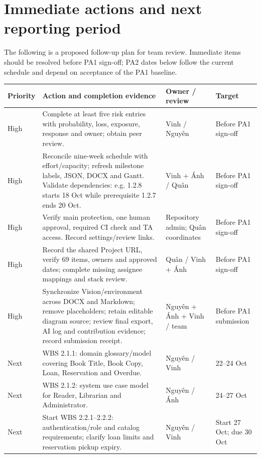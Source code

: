 \documentclass[11pt,a4paper]{article}
\begin{document}
\newpage
\section{Immediate actions and next reporting period}
The following is a proposed follow-up plan for team review. Immediate items should be resolved before PA1 sign-off; PA2 dates below follow the current schedule and depend on acceptance of the PA1 baseline.

{\small
\begin{tabularx}{\textwidth}{@{}P{17mm}YP{29mm}P{23mm}@{}}
\toprule
{}\textbf{Priority} & \textbf{Action and completion evidence} & \textbf{Owner / review} & \textbf{Target} \\
\midrule
High & Complete at least five risk entries with probability, loss, exposure, response and owner; obtain peer review. & Vinh / Nguyên & Before PA1 sign-off \\
\addlinespace[2pt]
High & Reconcile nine-week schedule with effort/capacity; refresh milestone labels, JSON, DOCX and Gantt. Validate dependencies: e.g. 1.2.8 starts 18 Oct while prerequisite 1.2.7 ends 20 Oct. & Vinh + Ánh / Quân & Before PA1 sign-off \\
\addlinespace[2pt]
High & Verify main protection, one human approval, required CI check and TA access. Record settings/review links. & Repository admin; Quân coordinates & Before PA1 sign-off \\
\addlinespace[2pt]
High & Record the shared Project URL, verify 69 items, owners and approved dates; complete missing assignee mappings and stack review. & Quân / Vinh + Ánh & Before PA1 sign-off \\
\addlinespace[2pt]
High & Synchronize Vision/environment across DOCX and Markdown; remove placeholders; retain editable diagram source; review final export, AI log and contribution evidence; record submission receipt. & Nguyên + Ánh + Vinh / team & Before PA1 submission \\
\addlinespace[2pt]
Next & WBS 2.1.1: domain glossary/model covering Book Title, Book Copy, Loan, Reservation and Overdue. & Nguyên / Vinh & 22--24 Oct \\
\addlinespace[2pt]
Next & WBS 2.1.2: system use case model for Reader, Librarian and Administrator. & Nguyên / Ánh & 24--27 Oct \\
\addlinespace[2pt]
Next & Start WBS 2.2.1--2.2.2: authentication/role and catalog requirements; clarify loan limits and reservation pickup expiry. & Nguyên / Vinh & Start 27 Oct; due 30 Oct \\
\bottomrule
\end{tabularx}}
\end{document}
